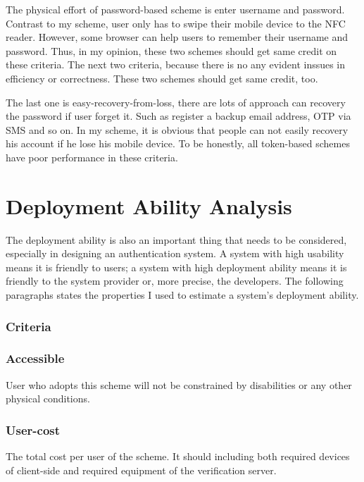 \begin{CJK}{Bg5}{bsmi}
The physical effort of password-based scheme is enter username and password. Contrast to my scheme, user only has to swipe their mobile device to the NFC reader. However, some browser can help users to remember their username and password. Thus, in my opinion, these two schemes should get same credit on these criteria. The next two criteria, because there is no any evident inssues in efficiency or correctness. These two schemes should get same credit, too.

The last one is easy-recovery-from-loss, there are lots of approach can recovery the password if user forget it. Such as register a backup email address, OTP via SMS and so on. In my scheme, it is obvious that people can not easily recovery his account if he lose his mobile device. To be honestly, all token-based schemes have poor performance in these criteria.

\section{Deployment Ability Analysis}

The deployment ability is also an important thing that needs to be considered, especially in designing an authentication system. A system with high usability means it is friendly to users; a system with high deployment ability means it is friendly to the system provider or, more precise, the developers. The following paragraphs states the properties I used to estimate a system's deployment ability.

\subsubsection{Criteria}

\subsubsection{Accessible}

User who adopts this scheme will not be constrained by disabilities or any other physical conditions.

\subsubsection{User-cost}

The total cost per user of the scheme. It should including both required devices of client-side and required equipment of the verification server.


\end{CJK}
